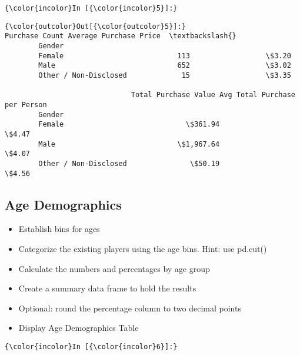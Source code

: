 \documentclass[11pt]{article}
\begin{document}
    \begin{Verbatim}[commandchars=\\\{\}]
{\color{incolor}In [{\color{incolor}5}]:} 
\end{Verbatim}


\begin{Verbatim}[commandchars=\\\{\}]
{\color{outcolor}Out[{\color{outcolor}5}]:}                       Purchase Count Average Purchase Price  \textbackslash{}
        Gender                                                        
        Female                           113                  \$3.20   
        Male                             652                  \$3.02   
        Other / Non-Disclosed             15                  \$3.35   
        
                              Total Purchase Value Avg Total Purchase per Person  
        Gender                                                                    
        Female                             \$361.94                         \$4.47  
        Male                             \$1,967.64                         \$4.07  
        Other / Non-Disclosed               \$50.19                         \$4.56  
\end{Verbatim}
            
    \subsection{Age Demographics}\label{age-demographics}

    \begin{itemize}
\item
  Establish bins for ages
\item
  Categorize the existing players using the age bins. Hint: use pd.cut()
\item
  Calculate the numbers and percentages by age group
\item
  Create a summary data frame to hold the results
\item
  Optional: round the percentage column to two decimal points
\item
  Display Age Demographics Table
\end{itemize}

    \begin{Verbatim}[commandchars=\\\{\}]
{\color{incolor}In [{\color{incolor}6}]:} 
\end{Verbatim}
\end{document}
